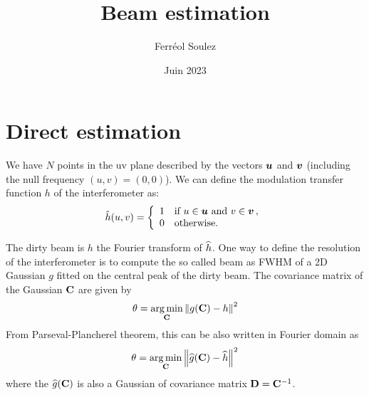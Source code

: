 \documentclass[a4paper,11pt,twoside]{scrartcl}
\title{Beam estimation}
\author{Ferréol Soulez }
\date{Juin 2023}
\begin{document}
\maketitle

\section{Direct estimation}

We have $N$ points in the uv plane described by the vectors $\boldsymbol{u}$ and $\boldsymbol{v}$ (including the null frequency  $(u,v) = (0,0)$). We can define the modulation transfer function $h$ of the interferometer  as:
\begin{equation}
	\hat{h}(u, v) = \left\{
		\begin{array}{ll}
		1 &\text{if } u \in \boldsymbol{u} \text{ and } v \in \boldsymbol{v}\,,\\
		0 &\text{otherwise.}
	\end{array} \right.
\end{equation} 

The dirty beam is $h$  the Fourier transform of $\widehat{h}$. One way to define the resolution of the interferometer is to compute the so called beam as FWHM of a 2D Gaussian $g$ fitted on the central peak of the dirty beam. The covariance matrix of the Gaussian $\mathbf{C}$ are given by
\begin{equation}
	\theta =  \argmin_{\M C} \Norm{ g(\M C) - h}^2 
\end{equation}
From  Parseval-Plancherel theorem, this can be also written in Fourier domain as
\begin{equation}
	\theta =  \argmin_{\M C} \Norm{\FT{g}(\M C) - \FT{h}}^2 
\end{equation}
where the $\widehat{g}(\mathbf{C})$ is also a Gaussian of covariance matrix $\mathbf{D} = \mathbf{C}^{-1}$.
\end{document}

